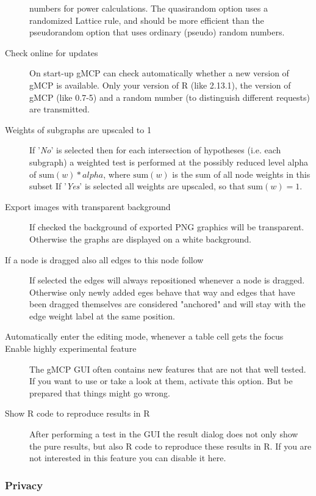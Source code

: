 \documentclass[a4paper, 10pt]{article}\usepackage[]{graphicx}\usepackage[]{color}
\numberwithin{equation}{section}
\theoremstyle{definition}
\theoremstyle{plain}
\begin{document}
\begin{description}
  numbers for power calculations. The quasirandom option uses a randomized
  Lattice rule, and should be more efficient than the pseudorandom option that
  uses ordinary (pseudo) random numbers.
  \item[Check online for updates] On start-up gMCP can check automatically
    whether a new version of gMCP is available. Only your version of R (like
    2.13.1), the version of gMCP (like 0.7-5) and a random number (to
    distinguish different requests) are transmitted.
  \item[Weights of subgraphs are upscaled to 1] If '\emph{No}' is selected then 
    for each intersection of hypotheses (i.e. each subgraph)
    a weighted test is performed at the possibly reduced level alpha of $\text{sum}(w)*alpha$,
    where $\text{sum}(w)$ is the sum of all node weights in this subset
    If '\emph{Yes}' is selected all weights are upscaled, so that $\text{sum}(w)=1$.
  \item[Export images with transparent background] If checked the background of
    exported PNG graphics will be transparent. Otherwise the graphs are
    displayed on a white background.
  \item[If a node is dragged also all edges to this node follow] If selected the
    edges will always repositioned whenever a node is dragged. Otherwise only
    newly added eges behave that way and edges that have been dragged themselves
    are considered "anchored" and will stay with the edge weight label at the
    same position.
  \item[Automatically enter the editing mode, whenever a table cell
    gets the focus] 
  \item[Enable highly experimental feature]\label{experimentalFeatures} The gMCP
    GUI often contains new features that are not that well tested. If you want
    to use or take a look at them, activate this option. But be prepared that
    things might go wrong.
  \item[Show R code to reproduce results in R] After performing a test in the GUI 
    the result dialog does not only show the pure results, but also R code to 
    reproduce these results in R. If you are not interested in this feature
    you can disable it here.
\end{description}

\subsubsection{Privacy}
\end{document}
